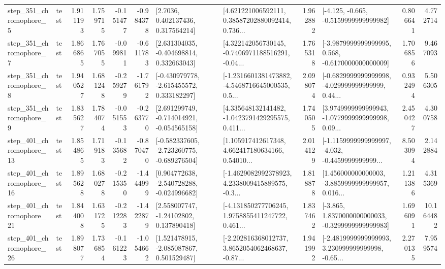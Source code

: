 \begin{tabular}{llrrrrllrlrr}
   step\_351\_chromophore\_5 &      test &      1.911193 &    1.759715 &     -0.151477 & -0.984378 &          [2.7036, 0.402137436, 0.317564214] &  [4.621221006592111, 0.38587202880092414, 0.736... &       1.962882 &              [-4.125, -0.665, -0.5159999999999982] &            0.806641 &          4.772714 \\
   step\_351\_chromophore\_7 &      test &      1.866865 &    1.767055 &     -0.099811 & -0.611783 &    [2.631304035, -0.404698814, 0.332663043] &  [4.322142056730145, -0.7406971188516291, -0.04... &       1.765318 &  [-3.9879999999999995, 0.568, -0.6170000000000009] &            1.706856 &          9.467093 \\
   step\_351\_chromophore\_8 &      test &      1.940527 &    1.681248 &     -0.259279 & -1.761792 &   [-0.430979778, -2.615455572, 0.333182297] &  [-1.2316601381473882, -4.5468716645000535, 0.5... &       2.098074 &  [-0.6829999999999998, -4.029999999999999, 0.44... &            0.932494 &          5.506305 \\
   step\_351\_chromophore\_9 &      test &      1.835627 &    1.784074 &     -0.051553 & -0.263770 &   [2.691299749, -0.714014921, -0.054565158] &  [4.335648132141482, -1.0423791429295575, 0.411... &       1.740505 &  [3.9749999999999943, -1.0779999999999998, 0.09... &            2.450427 &          4.300758 \\
  step\_401\_chromophore\_13 &      test &      1.854865 &    1.719183 &     -0.135682 & -0.870470 &  [-0.582337605, -2.723260775, -0.689276504] &  [1.105917412617348, 4.662417180634166, 0.54010... &       2.014129 &  [-1.1159999999999997, -4.032, -0.4459999999999... &            8.503094 &          2.142884 \\
  step\_401\_chromophore\_16 &      test &      1.895628 &    1.680278 &     -0.215350 & -1.444999 &   [0.904772638, -2.540728288, -0.024996682] &  [-1.4629082992378923, 4.2338009415889575, -0.3... &       1.818878 &  [1.456000000000003, -3.8859999999999957, 0.016... &            1.211386 &          4.315369 \\
  step\_401\_chromophore\_21 &      test &      1.844008 &    1.631725 &     -0.212283 & -1.422879 &     [2.558007747, -1.24102802, 0.137890418] &  [-4.131850277706245, 1.9758855411247722, 0.461... &       1.837462 &  [-3.865, 1.8370000000000033, -0.3299999999999983] &            1.696091 &         10.164482 \\
  step\_401\_chromophore\_26 &      test &      1.898077 &    1.736854 &     -0.161223 & -1.054662 &    [1.521478915, -2.085087867, 0.501529487] &  [-2.202816368012737, 3.8652054062468637, -0.87... &       1.941992 &  [-2.4819999999999993, 3.230999999999998, -0.65... &            2.270135 &          7.959574 \\

\end{tabular}
